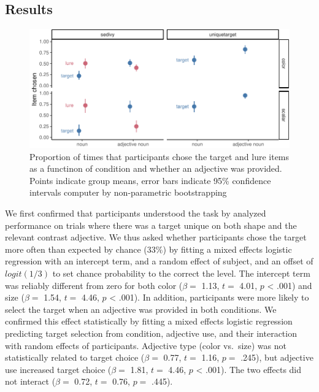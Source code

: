 \documentclass[10pt, letterpaper]{article}
\newenvironment{CodeChunk}{}{}
\begin{document}
\hypertarget{results}{%
\subsection{Results}\label{results}}

\begin{CodeChunk}
\begin{figure}[tb]

{\centering \includegraphics{figs/e1_fig-1} 

}

\caption[Proportion of times that participants chose the target and lure items as a functinon of condition and whether an adjective was provided]{Proportion of times that participants chose the target and lure items as a functinon of condition and whether an adjective was provided. Points indicate group means, error bars indicate 95\% confidence intervals computer by non-parametric bootstrapping}\label{fig:e1_fig}
\end{figure}
\end{CodeChunk}

We first confirmed that participants understood the task by analyzed
performance on trials where there was a target unique on both shape and
the relevant contrast adjective. We thus asked whether participants
chose the target more often than expected by chance (\(33\%\)) by
fitting a mixed effects logistic regression with an intercept term, and
a random effect of subject, and an offset of \(logit(1/3)\) to set
chance probability to the correct the level. The intercept term was
reliably different from zero for both color (\(\beta =\) 1.13, \(t =\)
4.01, \(p\) \textless{} .001) and size (\(\beta =\) 1.54, \(t =\) 4.46,
\(p\) \textless{} .001). In addition, participants were more likely to
select the target when an adjective was provided in both conditions. We
confirmed this effect statistically by fitting a mixed effects logistic
regression predicting target selection from condition, adjective use,
and their interaction with random effects of participants. Adjective
type (color vs.~size) was not statistically related to target choice
(\(\beta =\) 0.77, \(t =\) 1.16, \(p =\) .245), but adjective use
increased target choice (\(\beta =\) 1.81, \(t =\) 4.46, \(p\)
\textless{} .001). The two effects did not interact (\(\beta =\) 0.72,
\(t =\) 0.76, \(p =\) .445).
\end{document}
